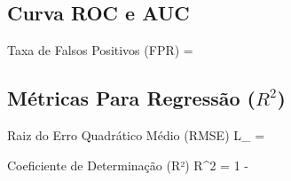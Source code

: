 \subsection{Curva ROC e AUC}

\begin{equacaodestaque}{Taxa de Falsos Positivos (FPR)}
     = 
    \label{eq:fpr}
\end{equacaodestaque}

\subsection{Métricas Para Regressão ($R^2$)}

\begin{equacaodestaque}{Raiz do Erro Quadrático Médio (RMSE)}
    L_{} = 
    \label{eq:rmse}
\end{equacaodestaque}

\begin{equacaodestaque}{Coeficiente de Determinação (R²)}
    R^2 = 1 - 
    \label{eq:r_quadrado}
\end{equacaodestaque}


